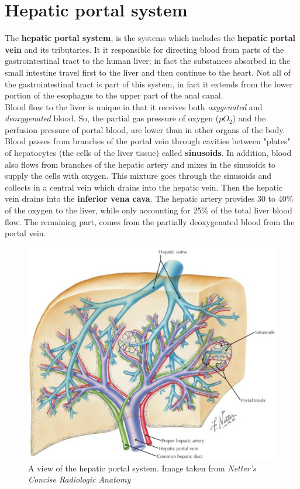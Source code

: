 \section{Hepatic portal system}\label{sec43:liverAnatomy}

The \textbf{hepatic portal system}, is the systems which includes the \textbf{hepatic portal vein} and its tributaries. It it responsible for directing blood from parts of the gastrointestinal tract to the human liver; in fact the substances absorbed in the small intestine travel first to the liver and then continue to the heart. Not all of the gastrointestinal tract is part of this system, in fact it extends from the lower portion of the esophagus to the upper part of the anal canal.\\

Blood flow to the liver is unique in that it receives both \textit{oxygenated} and \textit{deoxygenated} blood. So, the partial gas pressure of oxygen ($pO_2$) and the perfusion pressure of portal blood, are lower than in other organs of the body. Blood passes from branches of the portal vein through cavities between "plates" of hepatocytes (the cells of the liver tissue) called \textbf{sinusoids}. In addition, blood also flows from branches of the hepatic artery and mixes in the sinusoids to supply the cells with oxygen. This mixture goes through the sinusoids and collects in a central vein which drains into the hepatic vein. Then the hepatic vein drains into the \textbf{inferior vena cava}. The hepatic artery provides 30 to 40\% of the oxygen to the liver, while only accounting for 25\% of the total liver blood flow. The remaining part, comes from the partially deoxygenated blood from the portal vein.

\begin{figure}[htb] %
   \centering
   \includegraphics[width=0.95\linewidth]{images/hepaticPortalSystem.png}\hfill
   \caption[A view of the hepatic portal system]{A view of the hepatic portal system. Image taken from \textit{Netter's Concise Radiologic Anatomy}}
   \label{fig:portalSystem}
\end{figure}

